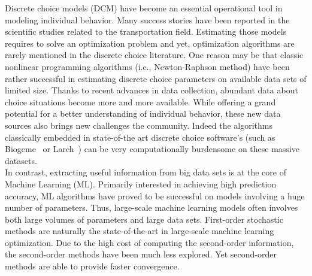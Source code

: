 \documentclass[conference]{IEEEtran}
\begin{document}
Discrete choice models (DCM) have become an essential operational tool in modeling individual behavior. Many success stories have been reported in the scientific studies related to the transportation field. Estimating those models requires to solve an optimization problem and yet, optimization algorithms are rarely mentioned in the discrete choice literature. One reason may be that classic nonlinear programming algorithms (i.e., Newton-Raphson method) have been rather successful in estimating discrete choice parameters on available data sets of limited size. Thanks to recent advances in data collection, abundant data about choice situations become more and more available. While offering a grand potential for a better understanding of individual behavior, these new data sources also brings new challenges the community. Indeed the algorithms classically embedded in state-of-the art discrete choice software's (such as Biogeme~\cite{bierlaire_biogeme:_2003} or Larch~\cite{newman_larch:_2016}) can be very computationally burdensome on these massive datasets. \\

In contrast, extracting useful information from big data sets is at the core of Machine Learning (ML). Primarily interested in achieving high prediction accuracy, ML algorithms have proved to be successful on models involving a huge number of parameters. Thus, large-scale machine learning models often involves both large volumes of parameters and large data sets. First-order stochastic methods are naturally the state-of-the-art in large-scale machine learning optimization.  Due to the high cost of computing the second-order information, the second-order methods have been much less explored. Yet second-order methods are able to provide faster convergence. \\
\end{document}

